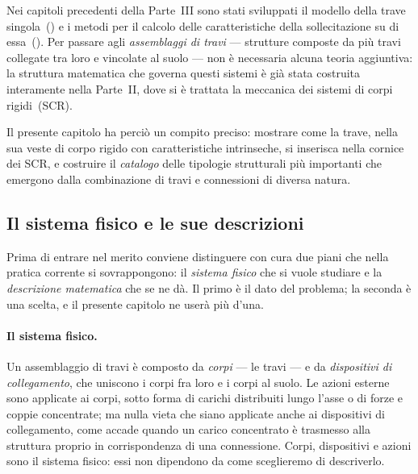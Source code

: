 Nei capitoli precedenti della Parte~III sono stati sviluppati
il modello della trave singola~() e
i metodi per il calcolo delle caratteristiche della
sollecitazione su di essa~().
Per passare agli \emph{assemblaggi di travi} --- strutture
composte da più travi collegate tra loro e vincolate al suolo
--- non è necessaria alcuna teoria aggiuntiva: la struttura
matematica che governa questi sistemi è già stata costruita
interamente nella Parte~II, dove si è trattata la meccanica
dei sistemi di corpi rigidi~(SCR).

Il presente capitolo ha perciò un compito preciso: mostrare
come la trave, nella sua veste di corpo rigido con caratteristiche
intrinseche, si inserisca nella cornice dei SCR,
e costruire il \emph{catalogo} delle tipologie strutturali
più importanti che emergono dalla combinazione di travi e
connessioni di diversa natura.


\subsection{Il sistema fisico e le sue descrizioni}
\label{subsec:sistema_descrizioni}

Prima di entrare nel merito conviene distinguere con
cura due piani che nella pratica corrente si sovrappongono:
il \emph{sistema fisico} che si vuole studiare e la
\emph{descrizione matematica} che se ne dà. Il primo è il
dato del problema; la seconda è una scelta, e il presente
capitolo ne userà più d'una.


\paragraph{Il sistema fisico.}
Un assemblaggio di travi è composto da \emph{corpi} ---
le travi --- e da \emph{dispositivi di collegamento}, che
uniscono i corpi fra loro e i corpi al suolo. Le azioni
esterne sono applicate ai corpi, sotto forma di carichi
distribuiti lungo l'asse o di forze e coppie concentrate;
ma nulla vieta che siano applicate anche ai dispositivi
di collegamento, come accade quando un carico concentrato
è trasmesso alla struttura proprio in corrispondenza di
una connessione. Corpi, dispositivi e azioni sono il
sistema fisico: essi non dipendono da come sceglieremo
di descriverlo.

